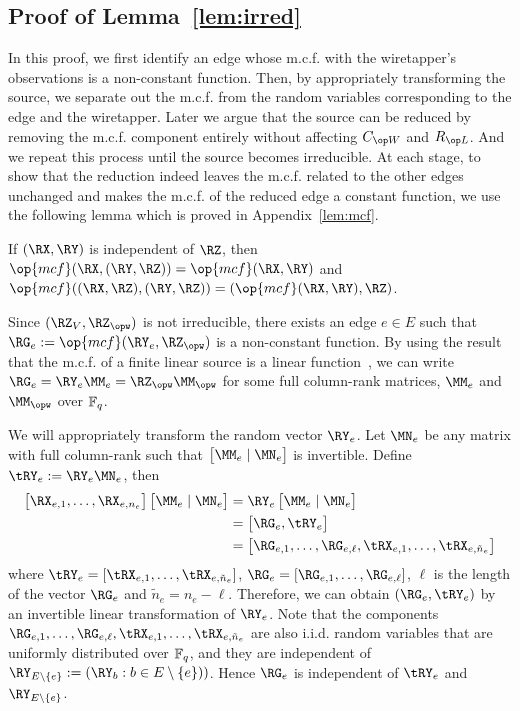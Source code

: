 \subsection{Proof of Lemma~\ref{lem:irred}}\label{lem:proof:irred}
In this proof, we first identify an edge whose m.c.f. with the wiretapper's observations is a non-constant function. Then, by appropriately transforming the source, we separate out the m.c.f. from the random variables corresponding to the edge and the wiretapper. Later we argue that the source can be reduced by removing the m.c.f. component entirely without affecting  $\wskc$ and $\rl$. And we repeat this process until the source becomes irreducible. At each stage, to show that the reduction indeed leaves the m.c.f. related to the other edges  unchanged and makes the m.c.f. of the reduced edge a constant function, we  use  the following lemma which is proved in Appendix~\ref{lem:mcf}.
\begin{lemma}\label{lem:indgk}
 If $(\RX,\RY)$ is independent of $\RZ$, then  $\op{mcf}(\RX, (\RY,\RZ)) = \op{mcf}(\RX,\RY)$ and $\op{mcf}((\RX,\RZ), (\RY,\RZ))  = \linebreak(\op{mcf}(\RX,\RY),\RZ)$.
\end{lemma}
 


 Since $(\RZ_V, \RZ_{\opw})$ is not irreducible, there exists an edge $e \in E$ such that $\RG_e := \op{mcf}(\RY_e, \RZ_{\opw})$ is a non-constant function. By using the result that the m.c.f. of a finite linear source is a linear function~\cite{chan18zero}, we can write $\RG_e =\RY_e \MM_e  =\RZ_{\opw} \MM_{\opw}$ for some full column-rank matrices, $\MM_e$ and $\MM_{\opw}$ over $\mathbb{F}_q$. 

We will appropriately transform the random vector $\RY_e$. Let $\MN_e$ be any matrix with full column-rank such that $\bM \MM_e \mid  \MN_e \eM$ is invertible. Define $\tRY_e := \RY_e \MN_e$, then
\begin{align*}
  \bM \RX_{e,1},\ldots,\RX_{e,n_e}\eM \bM \MM_e \mid  \MN_e \eM &= \RY_e \bM \MM_e \mid  \MN_e \eM \\
  &=\bM \RG_e, \tRY_e \eM\\
  &= \bM \RG_{e,1},\ldots,\RG_{e,\ell}, \tRX_{e,1},\ldots,\tRX_{e,\tilde{n}_e} \eM
\end{align*}
where $\tRY_e = [\tRX_{e,1},\ldots,\tRX_{e,\tilde{n}_e}]$, $\RG_e = [\RG_{e,1},\ldots, \RG_{e,\ell}]$, $\ell$ is the length of the vector $\RG_e$ and $\tilde{n}_e = n_e -\ell$. Therefore, we can obtain $(\RG_e, \tRY_e)$ by an invertible linear transformation of $\RY_e$. Note that the components $ \RG_{e,1},\ldots,\RG_{e,\ell}, \tRX_{e,1},\ldots,\linebreak \tRX_{e,\tilde{n}_e}$ are also  i.i.d. random variables that are uniformly distributed over $\mathbb{F}_q$, and they are independent of $ \RY_{E \setminus \{e\}}:=(\RY_b: b \in E \setminus \{e\}))$. Hence $\RG_e$ is independent of $\tRY_e$ and $\RY_{E \setminus \{e\}}$.

